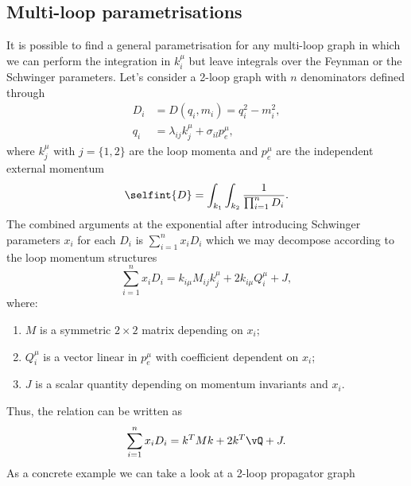 \subsection{Multi-loop parametrisations}
It is possible to find a general parametrisation for any multi-loop graph in which we can perform the integration in $k_i^\mu$ but leave integrals over the Feynman or the Schwinger parameters. Let's consider a 2-loop graph with $n$ denominators defined through 
\begin{align}
    D_i &= D(q_i,m_i) = q_i^2 - m_i^2, \\
    q_i &= \lambda_{ij}k_j^\mu + \sigma_{il}p_e^\mu,
\end{align}
where $k_j^\mu$ with $j = \{1,2\}$ are the loop momenta and $p_e^\mu$ are the independent external momentum
\begin{equation}
    \selfint{D} = \int_{k_1}\int_{k_2}\frac{1}{\prod_{i=1}^nD_i}.
\end{equation}
The combined arguments at the exponential after introducing Schwinger parameters $x_i$ for each $D_i$ is $\sum_{i=1}^nx_iD_i$ which we may decompose according to the loop momentum structures
\begin{equation}
    \sum_{i=1}^n x_iD_i = k_{i\mu}M_{ij}k_j^\mu + 2k_{i\mu}Q_i^\mu + J,
\end{equation}
where:
\begin{enumerate}
    \item $M$ is a symmetric $2\times 2$ matrix depending on $x_i$;
    \item $Q_i^\mu$ is a vector linear in $p_e^\mu$ with coefficient dependent on $x_i$;
    \item $J$ is a scalar quantity depending on momentum invariants and $x_i$.
\end{enumerate}
Thus, the relation can be written as
\begin{equation}
\label{eq: argument of exponential with S. parameters}
    \sum_{i=1}^n x_iD_i = k^TMk + 2k^T\vQ + J.
\end{equation}
As a concrete example we can take a look at a 2-loop propagator graph
